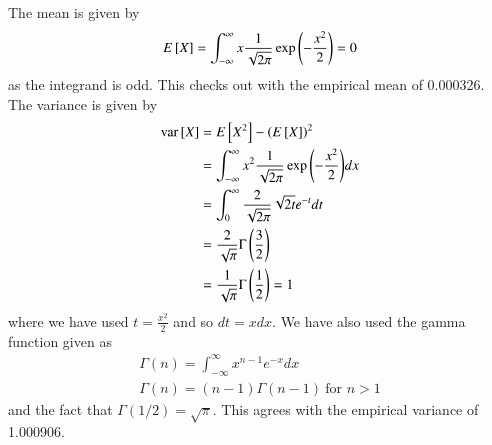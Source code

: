 \documentclass[journal,12pt,twocolumn]{IEEEtran}
\renewcommand\thesection{\arabic{section}}
\begin{document}
\begin{enumerate}[label=\thesection.\arabic*
,ref=\thesection.\theenumi]
\solution
The mean is given by
		\begin{align}
			E{}\left[X\right] = \int_{-\infty}^{\infty}x\frac{1}{\sqrt{2\pi}}\exp{\left(-\frac{x^2}{2}\right)} = 0
			\label{eq:gau-mean}
		\end{align}
as the integrand is odd. This checks out with the empirical mean of 0.000326. The variance is given by
		\begin{align}
			\text{var}{}\left[X\right] &= E{}\left[X^2\right] - \left(E{}\left[X\right]\right)^2 \\
			&= \int_{-\infty}^{\infty}x^2\frac{1}{\sqrt{2\pi}}\exp{\left(-\frac{x^2}{2}\right)}dx \label{eq:int} \\
			&= \int_{0}^{\infty}\frac{2}{\sqrt{2\pi}}\sqrt{2t}e^{-t}dt \\
			&= \frac{2}{\sqrt{\pi}}\Gamma\left(\frac{3}{2}\right) \\
			&= \frac{1}{\sqrt{\pi}}\Gamma\left(\frac{1}{2}\right) = 1
			\label{eq:gau-var}
		\end{align}
where we have used $t = \frac{x^2}{2}$ and so $dt = xdx$. We have also used the gamma function given as
\begin{align}
	\Gamma(n) = \int_{-\infty}^{\infty}x^{n - 1}e^{-x}dx \\
	\Gamma(n) = (n - 1)\Gamma(n - 1)\ \text{for $n > 1$}
\end{align}
and the fact that $\Gamma(1/2) = \sqrt{\pi}$.
This agrees with the empirical variance of 1.000906.
%
\end{enumerate}
\end{document}
